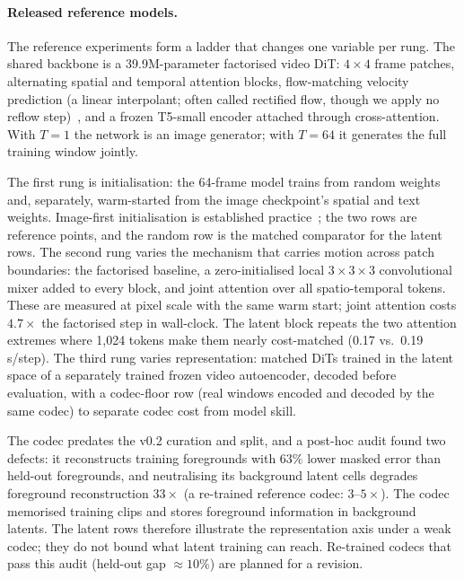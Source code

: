 \documentclass[11pt]{article}
\begin{document}
\paragraph{Released reference models.} The reference experiments form a ladder that changes one variable per
rung. The shared backbone is a 39.9M-parameter factorised video DiT: $4\times4$ frame patches, alternating
spatial and temporal attention blocks, flow-matching velocity prediction (a linear interpolant; often called
rectified flow, though we apply no reflow step)~\cite{peebles2023dit,lipman2023flow}, and a frozen T5-small
encoder attached through cross-attention. With $T{=}1$ the network is an image generator; with $T{=}64$ it
generates the full training window jointly.

The first rung is initialisation: the 64-frame model trains from random weights and, separately, warm-started
from the image checkpoint's spatial and text weights. Image-first initialisation is established
practice~\cite{ho2022vdm,singer2023makeavideo}; the two rows are reference points, and the random row is the
matched comparator for the latent rows. The second rung varies the mechanism that carries motion across patch
boundaries: the factorised baseline, a zero-initialised local $3{\times}3{\times}3$ convolutional mixer added
to every block, and joint attention over all spatio-temporal tokens. These are measured at pixel scale with the
same warm start; joint attention costs $4.7\times$ the factorised step in wall-clock. The latent block repeats
the two attention extremes where 1{,}024 tokens make them nearly cost-matched (0.17 vs.\ 0.19\,s/step). The
third rung varies representation: matched DiTs trained in the latent space of a separately trained frozen video
autoencoder, decoded before evaluation, with a codec-floor row (real windows encoded and decoded by the same
codec) to separate codec cost from model skill.

The codec predates the v0.2 curation and split, and a post-hoc audit found two defects: it reconstructs
training foregrounds with $63\%$ lower masked error than held-out foregrounds, and neutralising its background
latent cells degrades foreground reconstruction $33\times$ (a re-trained reference codec: $3$--$5\times$). The
codec memorised training clips and stores foreground information in background latents. The latent rows
therefore illustrate the representation axis under a weak codec; they do not bound what latent training can
reach. Re-trained codecs that pass this audit (held-out gap ${\approx}10\%$) are planned for a revision.
\end{document}

